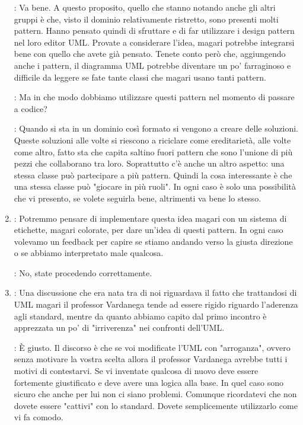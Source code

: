 \documentclass[../AnalisiDeiRequisiti.tex]{subfiles}
\begin{document}
\begin{enumerate}
		\proponente: Va bene. A questo proposito, quello che stanno notando anche gli altri
		gruppi è che, visto il dominio relativamente ristretto, sono presenti molti pattern.
		Hanno pensato quindi di sfruttare e di far utilizzare i design pattern nel loro
		editor UML.
		Provate a considerare l'idea, magari potrebbe integrarsi bene con quello che avete
		già pensato. Tenete conto però che, aggiungendo anche i pattern, il diagramma
		UML potrebbe diventare un po' farraginoso e difficile da leggere se fate
		tante classi che magari usano tanti pattern.

		\kaleidoscode: Ma in che modo dobbiamo utilizzare questi pattern nel momento di
		passare a codice?

		\proponente: Quando si sta in un dominio così formato si vengono a creare delle
		soluzioni. Queste soluzioni alle volte si riescono a riciclare come ereditarietà,
		alle volte come altro, fatto sta che capita saltino fuori pattern che sono
		l'unione di più pezzi che collaborano tra loro. Soprattutto c'è anche un altro
		aspetto: una stessa classe può partecipare a più pattern. Quindi la cosa
		interessante è che una stessa classe può "giocare in più ruoli". In ogni caso è
		solo una possibilità che vi presento, se volete seguirla bene, altrimenti va bene
		lo stesso.

		\item
		\kaleidoscode: Potremmo pensare di implementare questa idea magari con un sistema di
		etichette, magari colorate, per dare un'idea di questi pattern.
		In ogni caso volevamo un feedback per capire se stiamo andando verso la giusta
		direzione o se abbiamo interpretato male qualcosa.
		
		\proponente: No, state procedendo correttamente.
		
		\item
		\kaleidoscode: Una discussione che era nata tra di noi riguardava il fatto che
		trattandosi di UML magari il professor Vardanega tende ad essere rigido riguardo
		l'aderenza agli standard, mentre da quanto abbiamo capito dal primo incontro è
		apprezzata un po' di "irriverenza" nei confronti dell'UML. 

		\proponente: È giusto. Il discorso è che se voi modificate l'UML con "arroganza",
		ovvero senza motivare la vostra scelta allora il professor Vardanega avrebbe tutti
		i motivi di contestarvi. Se vi inventate qualcosa di nuovo deve essere fortemente
		giustificato e deve avere una logica alla base. In quel caso sono sicuro che anche
		per lui non ci siano problemi. Comunque ricordatevi che non dovete essere "cattivi"
		con lo standard. Dovete semplicemente utilizzarlo come vi fa comodo.


\end{enumerate}
\end{document}

